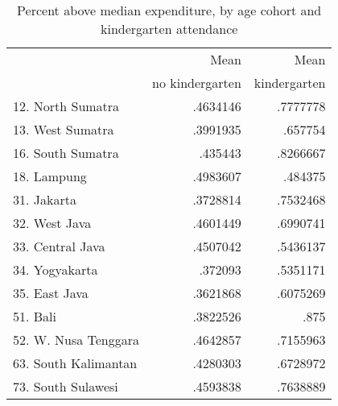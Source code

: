\begin{table}[!h]
\caption{Percent above median expenditure, by age cohort and kindergarten attendance}
\centering
\begin{tabular}{lll}
\cline{1-3}
\multicolumn{1}{c}{} &
  \multicolumn{1}{|r}{Mean} &
  \multicolumn{1}{r}{Mean} \\
\multicolumn{1}{c}{} &
  \multicolumn{1}{|r}{no kindergarten} &
  \multicolumn{1}{r}{kindergarten} \\
\cline{1-3}
\multicolumn{1}{l}{12. North Sumatra} &
  \multicolumn{1}{|r}{.4634146} &
  \multicolumn{1}{r}{.7777778} \\
\multicolumn{1}{l}{13. West Sumatra} &
  \multicolumn{1}{|r}{.3991935} &
  \multicolumn{1}{r}{.657754} \\
\multicolumn{1}{l}{16. South Sumatra} &
  \multicolumn{1}{|r}{.435443} &
  \multicolumn{1}{r}{.8266667} \\
\multicolumn{1}{l}{18. Lampung} &
  \multicolumn{1}{|r}{.4983607} &
  \multicolumn{1}{r}{.484375} \\
\multicolumn{1}{l}{31. Jakarta} &
  \multicolumn{1}{|r}{.3728814} &
  \multicolumn{1}{r}{.7532468} \\
\multicolumn{1}{l}{32. West Java} &
  \multicolumn{1}{|r}{.4601449} &
  \multicolumn{1}{r}{.6990741} \\
\multicolumn{1}{l}{33. Central Java} &
  \multicolumn{1}{|r}{.4507042} &
  \multicolumn{1}{r}{.5436137} \\
\multicolumn{1}{l}{34. Yogyakarta} &
  \multicolumn{1}{|r}{.372093} &
  \multicolumn{1}{r}{.5351171} \\
\multicolumn{1}{l}{35. East Java} &
  \multicolumn{1}{|r}{.3621868} &
  \multicolumn{1}{r}{.6075269} \\
\multicolumn{1}{l}{51. Bali} &
  \multicolumn{1}{|r}{.3822526} &
  \multicolumn{1}{r}{.875} \\
\multicolumn{1}{l}{52. W. Nusa Tenggara} &
  \multicolumn{1}{|r}{.4642857} &
  \multicolumn{1}{r}{.7155963} \\
\multicolumn{1}{l}{63. South Kalimantan} &
  \multicolumn{1}{|r}{.4280303} &
  \multicolumn{1}{r}{.6728972} \\
\multicolumn{1}{l}{73. South Sulawesi} &
  \multicolumn{1}{|r}{.4593838} &
  \multicolumn{1}{r}{.7638889} \\
\cline{1-3}
\end{tabular}
\end{table}
